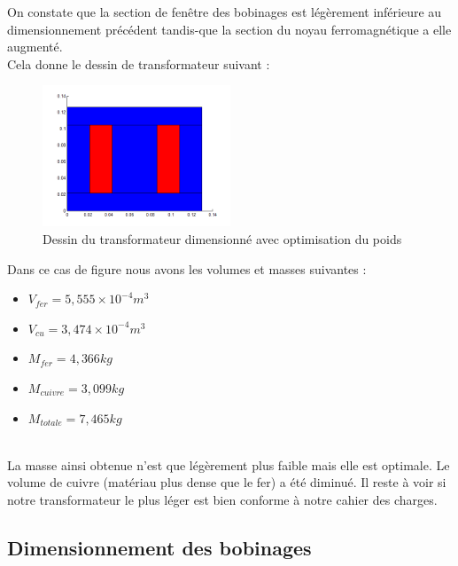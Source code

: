 On constate que la section de fenêtre des bobinages est légèrement inférieure au dimensionnement précédent tandis-que la section du noyau ferromagnétique a elle augmenté.\\

\newpage
Cela donne le dessin de transformateur suivant :\\
\begin{figure}[h]
	\begin{center}
	\includegraphics[width=0.5\textwidth]{images/TP1_transfo_poids}
	\caption{Dessin du transformateur dimensionné avec optimisation du poids}\label{img:dessinTransfoPoids}
	\end{center}
\end{figure}
\FloatBarrier 

Dans ce cas de figure nous avons les volumes et masses suivantes : \\
\begin{itemize}
\item $V_{fer} = 5,555 \times{}10^{-4} m^3$
\item $V_{cu} = 3,474 \times{}10^{-4} m^3$
\item $M_{fer} = 4,366 kg$
\item $M_{cuivre} = 3,099 kg $
\item $M_{totale} = 7,465 kg $
\end{itemize}~\\

La masse ainsi obtenue n'est que légèrement plus faible mais elle est optimale. Le volume de cuivre (matériau plus dense que le fer) a été diminué. Il reste à voir si notre transformateur le plus léger est bien conforme à notre cahier des charges.\\

\subsection{Dimensionnement des bobinages}

	
	
